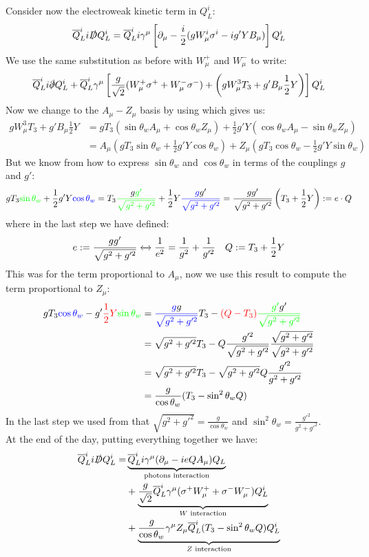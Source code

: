 \documentclass[../main.tex]{subfiles}
\begin{document}
Consider now the electroweak kinetic term in $Q_L^i$:
\[
\overline{Q}_L^ii\slashed{D}Q_L^i=\overline{Q}_L^ii\gamma^\mu\left[\partial_\mu-\frac{i}{2}(gW_\mu^i\sigma^i-ig'YB_\mu)\right]Q_L^i
\]
We use the same substitution as before with $W_\mu^+$ and $W_\mu^-$ to write:
\[
\overline{Q}_L^ii\slashed{\partial}Q_L^i+\overline{Q}_L^i\gamma^\mu\left[\frac{g}{\sqrt{2}}(W_\mu^+\sigma^++W_\mu^-\sigma^-)+\left(gW_\mu^3T_3+g'B_\mu \frac{1}{2}Y\right)\right]Q_L^i
\]
Now we change to the $A_\mu-Z_\mu$ basis by using  which gives us:
\begin{align*}
gW_\mu^3T_3+g'B_\mu\frac{1}{2}Y&=gT_3(\sin\theta_wA_\mu+\cos\theta_wZ_\mu)+\frac{1}{2}g'Y(\cos\theta_wA_\mu-\sin\theta_wZ_\mu)\\
&=A_\mu\left(gT_3\sin\theta_w+\frac{1}{2}g'Y\cos\theta_w\right)+Z_\mu\left(gT_3\cos\theta_w-\frac{1}{2}g'Y\sin\theta_w\right)
\end{align*}
But we know from  how to express $\sin\theta_w$ and $\cos\theta_w$ in terms of the couplings $g$ and $g'$:
\[
gT_3{\color{green}\sin\theta_w}+\frac{1}{2}g'Y{\color{blue}\cos\theta_w}=T_3{\color{green}\frac{{\color{black}g}g'}{\sqrt{g^2+g'^2}}}+\frac{1}{2}Y{\color{blue}\frac{g{\color{black}g'}}{\sqrt{g^2+g'^2}}}=\frac{gg'}{\sqrt{g^2+g'^2}}\left(T_3+\frac{1}{2}Y\right):=e\cdot Q
\]
where in the last step we have defined:
\[
e:=\frac{gg'}{\sqrt{g^2+g'^2}}\xleftrightarrow[]{}\frac{1}{e^2}=\frac{1}{g^2}+\frac{1}{g'^2} \quad Q:=T_3+\frac{1}{2}Y
\]
This was for the term proportional to $A_\mu$, now we use this result to compute the term proportional to $Z_\mu$:
\begin{align*}
gT_3{\color{blue}\cos\theta_w}-g'{\color{red}\frac{1}{2}Y}{\color{green}\sin\theta_w}&={\color{blue}\frac{g{\color{black}g}}{\sqrt{g^2+g'^2}}}T_3-{\color{red}(Q-T_3)}{\color{green}\frac{g'{\color{black}g'}}{\sqrt{g^2+g'^2}}}\\
&=\sqrt{g^2+g'^2}T_3-Q\frac{g'^2}{\sqrt{g^2+g'^2}}\frac{\sqrt{g^2+g'^2}}{\sqrt{g^2+g'^2}}\\
&=\sqrt{g^2+g'^2}T_3-\sqrt{g^2+g'^2}Q\frac{g'^2}{g^2+g'^2}\\
&=\frac{g}{\cos\theta_w}(T_3-\sin^2\theta_wQ)
\end{align*}
In the last step we used from  that $\sqrt{g^2+g'^2}=\frac{g}{\cos\theta_w}$ and $\sin^2\theta_w=\frac{g'^2}{g^2+g'^2}$.\\
At the end of the day, putting everything together we have:
\begin{align*}
\overline{Q}_L^ii\slashed{D}Q_L^i=&\underbrace{\overline{Q}_L^ii\gamma^\mu(\partial_\mu-ieQA_\mu)Q_L}_{\text{photons interaction}}\\
&+\underbrace{\frac{g}{\sqrt{2}}\overline{Q}_L^i\gamma^\mu(\sigma^+W_\mu^++\sigma^-W_\mu^-)Q_L^i}_{\text{$W$ interaction}}\\
&+\underbrace{\frac{g}{\cos\theta_w}\gamma^\mu Z_\mu\overline{Q}_L^i(T_3-\sin^2\theta_wQ)Q_L^i}_{\text{$Z$ interaction}}
\end{align*}
\end{document}

